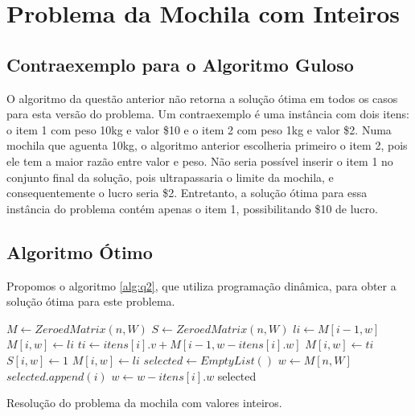 \documentclass[a4paper]{article}
\begin{document}
\section{Problema da Mochila com Inteiros}

\subsection{Contraexemplo para o Algoritmo Guloso}

O algoritmo da questão anterior não retorna a solução ótima em todos os casos para esta versão do problema. Um contraexemplo é uma instância com dois itens: o item 1 com peso 10kg e valor \$10 e o item 2 com peso 1kg e valor \$2. Numa mochila que aguenta 10kg, o algoritmo anterior escolheria primeiro o item 2, pois ele tem a maior razão entre valor e peso. Não seria possível inserir o item 1 no conjunto final da solução, pois ultrapassaria o limite da mochila, e consequentemente o lucro seria \$2. Entretanto, a solução ótima para essa instância do problema contém apenas o item 1, possibilitando \$10 de lucro.

\subsection{Algoritmo Ótimo}

Propomos o algoritmo \ref{alg:q2}, que utiliza programação dinâmica, para obter a solução ótima para este problema.

\begin{algorithm}[H]
\begin{algorithmic}[1]
    \State {} \label{alg:q2:init:start}
    \State $M \gets ZeroedMatrix(n, W)$ 
    \State $S \gets ZeroedMatrix(n, W)$  \label{alg:q2:init:end}
    \State {} \label{alg:q2:calcopt:start}
        \State $li \gets M[i - 1, w]$ 
          \State $M[i, w] \gets li$
        \Else
          \State {}
          \State $ti \gets itens[i].v + M[i- 1, w - itens[i].w]$
            \State $M[i, w] \gets ti$
            \State $S[i, w] \gets 1$ 
          \Else
            \State $M[i, w] \gets li$
          \EndIf
        \EndIf
      \EndFor
    \EndFor \label{alg:q2:calcopt:end}
    \State {} \label{alg:q2:select:start}
    \State $selected \gets EmptyList()$
    \State $w \gets M[n, W]$
        \State $selected.append(i)$
        \State $w \gets w - itens[i].w$
      \EndIf
    \EndFor
    \State \Return selected \label{alg:q2:select:end}
  \EndFunction
\end{algorithmic}
\caption{Resolução do problema da mochila com valores inteiros.}
\label{alg:q2}
\end{algorithm}
\end{document}

